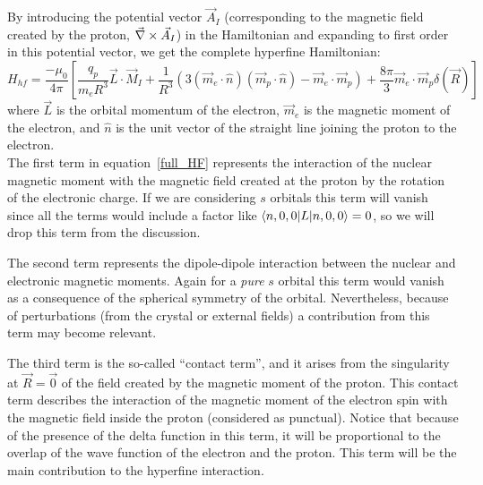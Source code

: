 By introducing the potential vector $\vec{A}_{I}$ (corresponding to the magnetic field created by the proton, $\vec{\nabla}\times\vec{A}_{I}$) in the Hamiltonian and expanding to first order in this potential vector, we get the complete hyperfine Hamiltonian:~\cite{Cohen1977book}
\begin{equation}
H_{hf} = \frac{-\mu_{0}}{4\pi}\left[
\frac{q_{p}}{m_{e}R^{3}}\vec{L}\cdot\vec{M}_{I} +
\frac{1}{R^{3}}\left(3(\vec{m}_{e}\cdot\hat{n})
                      (\vec{m}_{p}\cdot\hat{n})-
                      \vec{m}_{e}\cdot\vec{m}_{p}\right) +
\frac{8\pi}{3}\vec{m}_{e}\cdot\vec{m}_{p}\delta(\vec{R})
\right]
\label{full_HF}
\end{equation}
where $\vec{L}$ is the orbital momentum of the electron, $\vec{m}_{e}$ is the magnetic moment of the electron, and $\hat{n}$ is the unit vector of the straight line joining the proton to the electron.\\

The first term in equation~\eqref{full_HF} represents the interaction of the nuclear magnetic moment with the magnetic field created at the proton by the rotation of the electronic charge. If we are considering $s$ orbitals this term will vanish since all the terms would include a factor like $\langle n,0,0|L|n,0,0\rangle = 0$, so we will drop this term from the discussion.

The second term represents the dipole-dipole interaction between the nuclear and electronic magnetic moments. Again for a \textit{pure} $s$ orbital this term would vanish as a consequence of the spherical symmetry of the orbital. Nevertheless, because of perturbations (from the crystal or external fields) a contribution from this term may become relevant. %

The third term is the so-called ``contact term'', and it arises from the singularity at $\vec{R}=\vec{0}$ of the field created by the magnetic moment of the proton.
This contact term describes the interaction of the magnetic moment of the electron spin with the magnetic field inside the proton (considered as punctual). Notice that because of the presence of the delta function in this term, it will be proportional to the overlap of the wave function of the electron and the proton. This term will be the main contribution to the hyperfine interaction.\\

